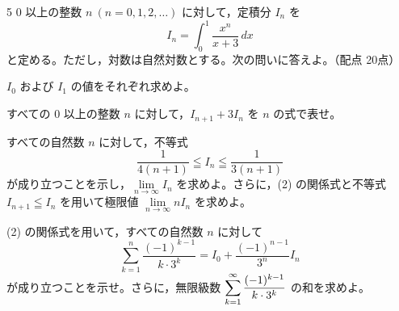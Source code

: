 \begin{monsheet}
\begin{daimon}{5}
$0$ 以上の整数 $n\ (n=0, 1, 2, \ldots)$ に対して，定積分 $I_{n}$ を
\[
  I_{n} = \int_{0}^{1}\frac{x^{n}}{x+3}\,dx
\]
と定める。ただし，対数は自然対数とする。次の問いに答えよ。\hfill（配点 20点）
\begin{shomon}
  \item $I_{0}$ および $I_{1}$ の値をそれぞれ求めよ。
  \item すべての $0$ 以上の整数 $n$ に対して，$I_{n+1}+3I_{n}$ を $n$ の式で表せ。
  \item すべての自然数 $n$ に対して，不等式
  \[
    \frac{1}{4(n+1)} \leqq I_{n} \leqq \frac{1}{3(n+1)}
  \]
  が成り立つことを示し，$\lim\limits_{n\to\infty}I_{n}$ を求めよ。さらに，(2) の関係式と不等式 $I_{n+1}\leqq I_{n}$ を用いて極限値 $\lim\limits_{n\to\infty}nI_{n}$ を求めよ。
  \item (2) の関係式を用いて，すべての自然数 $n$ に対して
  \[
    \sum_{k=1}^{n}\frac{(-1)^{k-1}}{k\cdot 3^{k}} = I_{0} + \frac{(-1)^{n-1}}{3^{n}}I_{n}
  \]
  が成り立つことを示せ。さらに，無限級数 $\displaystyle\sum_{k=1}^{\infty}\frac{(-1)^{k-1}}{k\cdot 3^{k}}$ の和を求めよ。
\end{shomon}
\end{daimon}

\scratchpage
\end{monsheet}
